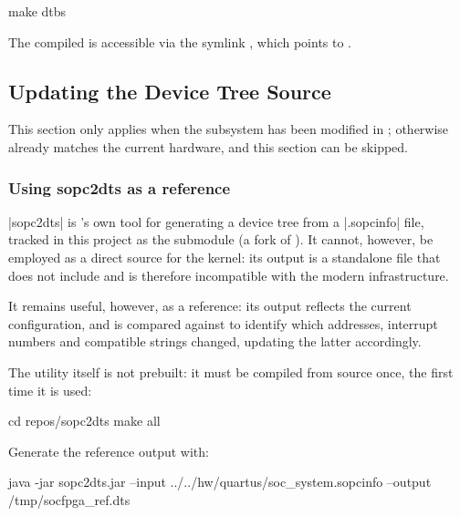 \begin{shellcodehost}
make dtbs
\end{shellcodehost}

The compiled  is accessible via the symlink , which points to .

\subsection{Updating the Device Tree Source}
\label{subsec:fpgalix-dts-update}

This section only applies when the  subsystem has been modified in ; otherwise  already matches the current hardware, and this section can be skipped.

\subsubsection{Using sopc2dts as a reference}

|sopc2dts| is 's own tool for generating a device tree from a |.sopcinfo| file, tracked in this project as the  submodule (a fork of ). It cannot, however, be employed as a direct  source for the kernel: its output is a standalone file that does not include  and is therefore incompatible with the modern    infrastructure.

It remains useful, however, as a reference: its output reflects the current  configuration, and is compared against  to identify which addresses, interrupt numbers and compatible strings changed, updating the latter accordingly.

The  utility itself is not prebuilt: it must be compiled from source once, the first time it is used:

\begin{shellcodehost}
cd repos/sopc2dts
make all
\end{shellcodehost}

Generate the reference output with:

\begin{shellcodehost}
java -jar sopc2dts.jar --input ../../hw/quartus/soc_system.sopcinfo --output /tmp/socfpga_ref.dts
\end{shellcodehost}

